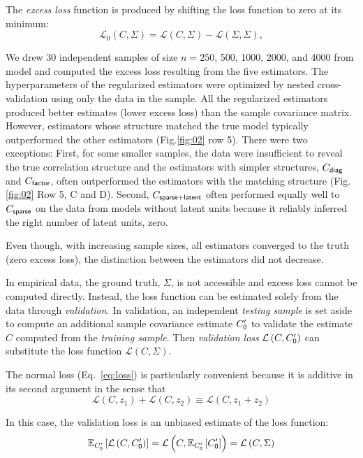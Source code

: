 \documentclass[10pt]{article}
\newcommand{\figref}[2]{Fig.\;\ref{fig:#1}\,#2}
\newcommand{\loss}[1]{\mathcal L\left(#1\right)}
\newcommand{\eloss}[1]{\mathcal L_0\left(#1\right)}
\newcommand{\E}[2][]{\mathbb E_{#1}\left[ #2\right]}    %
\begin{document}
The \emph{excess loss} function is produced by shifting the loss function to zero at its minimum:
\begin{equation}\label{eq:excess-loss}
    \eloss{C,\Sigma} = \loss{C,\Sigma}-\loss{\Sigma,\Sigma},
\end{equation}

We drew 30 independent samples of size $n=250$, 500, 1000, 2000, and 4000 from model and computed the excess loss resulting from the five estimators.  The hyperparameters of the regularized estimators were optimized by nested cross-validation using only the data in the sample.  All the regularized estimators produced better estimates (lower excess loss) than the sample covariance matrix.  However, estimators whose structure matched the true model typically outperformed the other estimators (\figref{02}{\,row 5}).  There were two exceptions: First, for some smaller samples, the data were insufficient to reveal the true correlation structure and the estimators with simpler structures, $C_{\sf diag}$ and $C_{\sf factor}$, often outperformed the estimators with the matching structure (\figref{02}{\,Row 5, C and D}).  Second, $C_{\sf sparse+latent}$ often performed equally well to $C_{\sf sparse}$ on the data from models without latent units because it reliably inferred the right number of latent units, zero.  

Even though, with increasing sample sizes, all estimators converged to the truth (zero excess loss), the distinction between the estimators did not decrease. 

In empirical data, the ground truth, $\Sigma$, is not accessible and excess loss cannot be computed directly. Instead, the loss function can be estimated solely from the data through \emph{validation}.  In validation, an independent \emph{testing sample} is set aside to compute an additional sample covariance estimate $C_{\sf 0}^\prime$ to validate the estimate $C$ computed from the  \emph{training sample}.  Then \emph{validation loss} $\loss{C,C_{\sf 0}^\prime}$ can substitute the loss function $\loss{C,\Sigma}$.  

The normal loss (Eq.~\ref{eq:loss}) is particularly convenient because it is additive in its second argument in the sense that 
 \begin{equation*}\label{eq:additivity}
 \loss{C,z_1} + \loss{C,z_2} \equiv \loss{C,z_1+z_2}
 \end{equation*}

In this case, the validation loss is an unbiased estimate of the loss function:
\begin{equation*}
    \E[C_{\sf 0}^\prime]{\loss{C,C_{\sf 0}^\prime}}=\loss{C,\E[C_{\sf 0}^\prime]{C_{\sf 0}^\prime}}=\loss{C,\Sigma}
\end{equation*}
\end{document}
